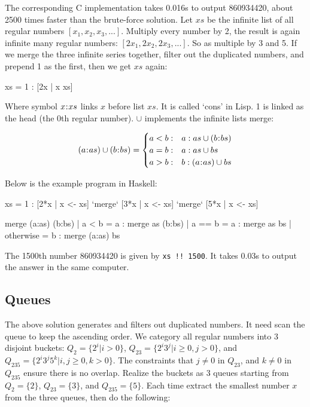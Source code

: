 \documentclass[b5paper]{article}
\begin{document}
The corresponding C implementation takes 0.016s to output 860934420, about 2500 times faster than the brute-force solution. Let $xs$ be the infinite list of all regular numbers $[x_1, x_2, x_3, ...]$. Multiply every number by 2, the result is again infinite many regular numbers: $[2x_1, 2x_2, 2x_3, ...]$. So as multiple by 3 and 5. If we merge the three infinite series together, filter out the duplicated numbers, and prepend 1 as the first, then we get $xs$ again:

\be
  xs = 1 : [2x | x \gets xs] \cup [3x | x \gets xs] \cup [5x | x \gets xs]
\ee

Where symbol $x \mathbin{\!:\!} xs$ links $x$ before list $xs$. It is called `cons' in Lisp. 1 is linked as the head (the 0th regular number). $\cup$ implements the infinite lists merge:

\[
(a \cons as) \cup (b \cons bs) = \begin{cases}
  a < b: & a : as \cup (b \cons bs) \\
  a = b: & a : as \cup bs \\
  a > b: & b : (a \cons as) \cup bs \\
\end{cases}
\]

Below is the example program in Haskell:

\begin{Haskell}
xs = 1 : [2*x | x <- xs] `merge` [3*x | x <- xs] `merge` [5*x | x <- xs]

merge (a:as) (b:bs) | a < b = a : merge as (b:bs)
                    | a == b = a : merge as bs
                    | otherwise = b : merge (a:as) bs
\end{Haskell}

The 1500th number 860934420 is given by \texttt{xs !! 1500}. It takes 0.03s to output the answer in the same computer.

\subsection*{Queues}
The above solution generates and filters out duplicated numbers. It need scan the queue to keep the ascending order. We category all regular numbers into 3 disjoint buckets: $Q_2 = \{2^i | i > 0\}$, $Q_{23} = \{ 2^i3^j | i \geq 0, j > 0 \}$, and $Q_{235} = \{ 2^i3^j5^k | i,j \geq 0, k > 0\}$. The constraints that $j \neq 0$ in $Q_{23}$, and $k \neq 0$ in $Q_{235}$ ensure there is no overlap. Realize the buckets as 3 queues starting from $Q_2 = \{ 2 \}$, $Q_{23} = \{ 3\}$, and $Q_{235} = \{ 5 \}$. Each time extract the smallest number $x$ from the three queues, then do the following:
\end{document}

